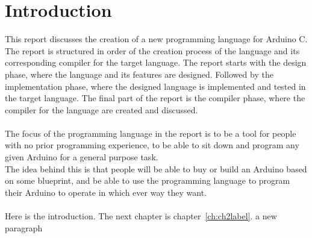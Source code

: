 \chapter{Introduction}\label{ch:introduction}
This report discusses the creation of a new programming language for Arduino C.\\
The report is structured in order of the creation process of the language and its corresponding compiler for the target language. The report starts with the design phase, where the language and its features are designed. Followed by the implementation phase, where the designed language is implemented and tested in the target language. The final part of the report is the compiler phase, where the compiler for the language are created and discussed.
\\\\
The focus of the programming language in the report is to be a tool for people with no prior programming experience, to be able to sit down and program any given Arduino for a general purpose task.\\
The idea behind this is that people will be able to buy or build an Arduino based on some blueprint, and be able to use the programming language to program their Arduino to operate in which ever way they want.
\\\\





Here is the introduction. The next chapter is chapter~\ref{ch:ch2label}.
a new paragraph



